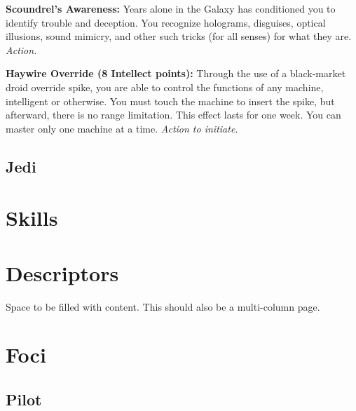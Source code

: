 \documentclass[a4paper,10pt,final,twocolumn,oneside]{book}
\newcommand{\itemAbility}[2]{\textcolor{25gray}{\textbullet\textbf{ #1:}}{ #2}\par}
\newcommand{\action}{\textit{ Action.}}
\newcommand{\actionInit}{\textit{ Action to initiate.}}
\begin{document}
\itemAbility{Scoundrel's Awareness}{Years alone in the Galaxy has conditioned you to identify trouble and deception. You recognize holograms, disguises, optical illusions, sound mimicry, and other such tricks (for all senses) for what they are.\action}

\itemAbility{Haywire Override (8 Intellect points)}{ Through the use of a black-market droid override spike, you are able to control the functions of any machine, intelligent or otherwise. You must touch the machine to insert the spike, but afterward, there is no range limitation. This effect lasts for one week. You can master only one machine at a time.\actionInit}


\clearpage

%
%
%
%
%
%
%
%
%
%
%
%
%
%
%
%
%
%
%


\subsection{Jedi} %
\label{sub:jedi}



\clearpage

\section{Skills} %
\label{sec:skills}


\clearpage

\section{Descriptors} %
\label{sec:descriptors}

Space to be filled with content. This should also be a multi-column page.


\clearpage

\section{Foci} %
\label{sec:foci}

\subsection{Pilot} %
\label{sub:pilot}
\end{document}
